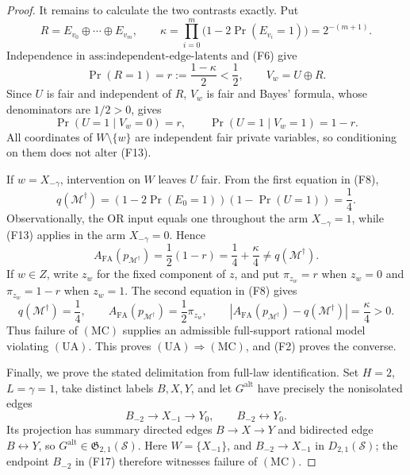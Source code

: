 \documentclass{article}
\begin{document}
\begin{proof}
It remains to calculate the two contrasts exactly.  Put
\[
R=E_{v_0}\mathbin\oplus\cdots\mathbin\oplus E_{v_m},
\qquad
\kappa=\prod_{i=0}^{m}\bigl(1-2\Pr(E_{v_i}=1)\bigr)=2^{-(m+1)}.
\tag{F11}
\]
Independence in \(\text{ass:independent-edge-latents}\) and (F6) give
\[
\Pr(R=1)=r:=\frac{1-\kappa}{2}<\frac12,
\qquad
V_w=U\mathbin\oplus R.
\tag{F12}
\]
Since \(U\) is fair and independent of \(R\), \(V_w\) is fair and Bayes' formula, whose denominators are \(1/2>0\), gives
\[
\Pr(U=1\mid V_w=0)=r,
\qquad
\Pr(U=1\mid V_w=1)=1-r.
\tag{F13}
\]
All coordinates of \(W\setminus\{w\}\) are independent fair private variables, so conditioning on them does not alter (F13).

If \(w=X_{-\gamma}\), intervention on \(W\) leaves \(U\) fair.  From the first equation in (F8),
\[
q(\mathcal M^{\dagger})
=\left(1-2\Pr(E_0=1)\right)\left(1-\Pr(U=1)\right)
=\frac14.
\tag{F14}
\]
Observationally, the OR input equals one throughout the arm \(X_{-\gamma}=1\), while (F13) applies in the arm \(X_{-\gamma}=0\).  Hence
\[
A_{\mathrm{FA}}(p_{\mathcal M^{\dagger}})
=\frac12(1-r)
=\frac14+\frac{\kappa}{4}
\ne q(\mathcal M^{\dagger}).
\tag{F15}
\]
If \(w\in Z\), write \(z_w\) for the fixed component of \(z\), and put \(\pi_{z_w}=r\) when \(z_w=0\) and \(\pi_{z_w}=1-r\) when \(z_w=1\).  The second equation in (F8) gives
\[
q(\mathcal M^{\dagger})=\frac14,
\qquad
A_{\mathrm{FA}}(p_{\mathcal M^{\dagger}})=\frac12\pi_{z_w},
\qquad
\left|A_{\mathrm{FA}}(p_{\mathcal M^{\dagger}})-q(\mathcal M^{\dagger})\right|=\frac{\kappa}{4}>0.
\tag{F16}
\]
Thus failure of \(\mathrm{(MC)}\) supplies an admissible full-support rational model violating \(\mathrm{(UA)}\).  This proves \(\mathrm{(UA)}\Rightarrow\mathrm{(MC)}\), and (F2) proves the converse.

Finally, we prove the stated delimitation from full-law identification.  Set \(H=2\), \(L=\gamma=1\), take distinct labels \(B,X,Y\), and let \(G^{\mathrm{alt}}\) have precisely the nonisolated edges
\[
B_{-2}\to X_{-1}\to Y_0,
\qquad
B_{-2}\leftrightarrow Y_0.
\tag{F17}
\]
Its projection has summary directed edges \(B\to X\to Y\) and bidirected edge \(B\leftrightarrow Y\), so \(G^{\mathrm{alt}}\in\mathfrak G_{2,1}(\mathcal S)\).  Here \(W=\{X_{-1}\}\), and \(B_{-2}\to X_{-1}\) in \(D_{2,1}(\mathcal S)\); the endpoint \(B_{-2}\) in (F17) therefore witnesses failure of \(\mathrm{(MC)}\).


\end{proof}
\end{document}
